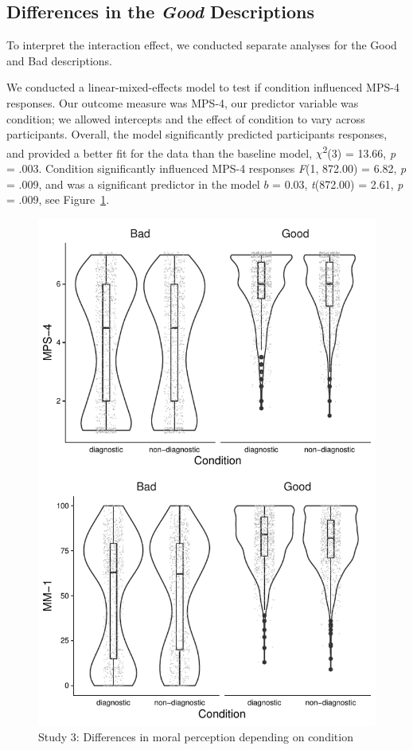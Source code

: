 \documentclass[
  english,
  man,floatsintext]{apa7}
\begin{document}
\hypertarget{differences-in-the-good-descriptions}{%
\subsection{\texorpdfstring{Differences in the \emph{Good} Descriptions}{Differences in the Good Descriptions}}\label{differences-in-the-good-descriptions}}

To interpret the interaction effect, we conducted separate analyses for the Good and Bad descriptions.

We conducted a linear-mixed-effects model to test if condition influenced MPS-4 responses. Our outcome measure was MPS-4, our predictor variable was condition; we allowed intercepts and the effect of condition to vary across participants. Overall, the model significantly predicted participants responses, and provided a better fit for the data than the baseline model, \(\chi\)\textsuperscript{2}(3) = 13.66, \emph{p} = .003. Condition significantly influenced MPS-4 responses \emph{F}(1, 872.00) = 6.82, \emph{p} = .009, and was a significant predictor in the model \(b\) = 0.03, \emph{t}(872.00) = 2.61, \emph{p} = .009, see Figure~\ref{fig:S3bothconditionplot}.

\begin{figure}
\centering
\includegraphics{moral_dilution_in_chunks_files/figure-latex/S3bothconditionplot-1.pdf}
\caption{\label{fig:S3bothconditionplot}Study 3: Differences in moral perception depending on condition}
\end{figure}
\end{document}
